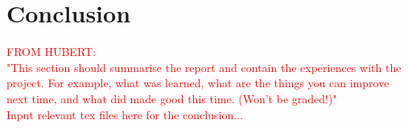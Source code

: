\chapter{Conclusion}
\textcolor{red}{FROM HUBERT:\\
"This section should summarise the report and contain the experiences with the project. For example, what was learned, what are the things you can improve next time, and what did made good this time. (Won’t be graded!)"\\
Input relevant tex files here for the conclusion...}
